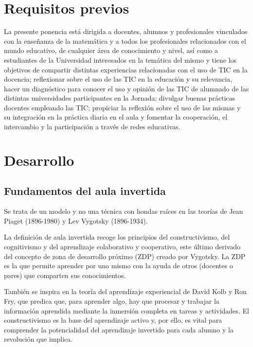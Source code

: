 \documentclass[oneside,spanish]{amsart}
\numberwithin{equation}{section}
\numberwithin{figure}{section}
\theoremstyle{definition}
\begin{document}
\section{Requisitos previos}

La presente ponencia está dirigida a docentes, alumnos y profesionales vinculados con la enseñanza de la matemática y a todos los profesionales relacionados con el mundo educativo, de cualquier área de conocimiento y nivel, así como a estudiantes de la Universidad interesados en la temática del mismo y tiene los objetivos de compartir distintas experiencias relacionadas con el uso de TIC en la docencia; reflexionar sobre el uso de las TIC en la educación y su relevancia, hacer un diagnóstico para conocer el uso y opinión de las TIC de alumnado de las distintas universidades participantes en la Jornada; divulgar buenas prácticas docentes empleando las TIC; propiciar la reflexión sobre el uso de las mismas y su integración en la práctica diaria en el aula y fomentar la cooperación, el intercambio y la participación a través de redes educativas.

\section{Desarrollo}

\subsection{Fundamentos del aula invertida}

Se trata de un modelo y no una técnica con hondas raíces en las teorías de Jean Piaget (1896-1980) y Lev Vygotsky (1896-1934). 

La definición de aula invertida recoge los principios del constructivismo, del cognitivismo y del aprendizaje colaborativo y cooperativo, este último derivado del concepto de zona de desarrollo próximo (ZDP) creado por Vygotsky. La ZDP es la que permite aprender por uno mismo con la ayuda de otros (docentes o pares) que comparten sus conocimientos.

También se inspira en la teoría del aprendizaje experiencial de David Kolb y Ron Fry, que predica que, para aprender algo, hay que procesar y trabajar la información aprendida mediante la inmersión completa en tareas y actividades.
El constructivismo es la base del aprendizaje activo y, por ello, es vital para comprender la potencialidad del aprendizaje invertido para cada alumno y la revolución que implica.
\end{document}
